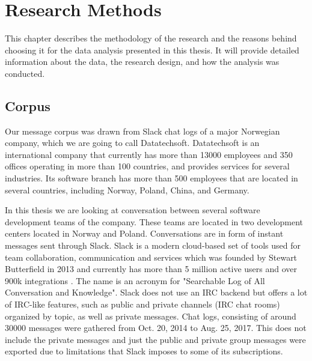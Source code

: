\chapter{Research Methods}
This chapter describes the methodology of the research and the reasons behind choosing it for the data analysis presented in this thesis. It will provide detailed information about the data, the research design, and how the analysis was conducted.


\section{Corpus}
Our message corpus was drawn from Slack chat logs of a major Norwegian company, which we are going to call Datatechsoft. Datatechsoft is an international company that currently has more than 13000 employees and 350 offices operating in more than 100 countries, and provides services for several industries. Its software branch has more than 500 employees that are located in several countries, including Norway, Poland, China, and Germany. 

In this thesis we are looking at conversation between several software development teams of the company. These teams are located in two development centers located in Norway and Poland. Conversations are in form of instant messages sent through Slack. Slack is a modern cloud-based set of tools used for team collaboration, communication and services which was founded by Stewart Butterfield in 2013 and currently has more than 5 million active users and over 900k integrations \citep{Lin2016WhySlack}. The name is an acronym for "Searchable Log of All Conversation and Knowledge". Slack does not use an IRC backend but offers a lot of IRC-like features, such as public and private channels (IRC chat rooms) organized by topic, as well as private messages. 
Chat logs, consisting of around 30000 messages were gathered from Oct. 20, 2014 to Aug. 25, 2017. This does not include the private messages and just the public and private group messages were exported due to limitations that Slack imposes to some of its subscriptions.

